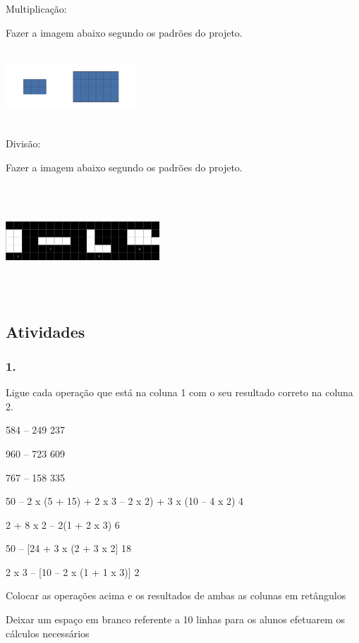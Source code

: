 Multiplicação:

Fazer a imagem abaixo segundo os padrões do projeto.

\includegraphics[width=1.92308in,height=1.09649in]{media/image30.png}

Divisão:

Fazer a imagem abaixo segundo os padrões do projeto.

\includegraphics[width=2.26923in,height=1.66995in]{media/image31.png}

\subsection{Atividades}\label{atividades-1}

\subsubsection{1.}\label{section-13}

Ligue cada operação que está na coluna 1 com o seu resultado correto na
coluna 2.

584 -- 249 237

960 -- 723 609

767 -- 158 335

50 -- 2 x (5 + 15) + 2 x 3 -- 2 x 2) + 3 x (10 -- 4 x 2) 4

2 + 8 x 2 -- 2(1 + 2 x 3) 6

50 -- {[}24 + 3 x (2 + 3 x 2{]} 18

2 x 3 -- {[}10 -- 2 x (1 + 1 x 3){]} 2

Colocar as operações acima e os resultados de ambas as colunas em
retângulos

Deixar um espaço em branco referente a 10 linhas para os alunos
efetuarem os cálculos necessários

